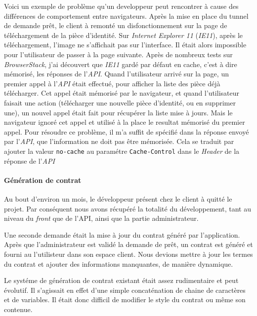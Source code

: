 \documentclass[12pt,a4paper]{article}
\begin{document}
  Voici un exemple de problème qu'un developpeur peut rencontrer à cause
  des différences de comportement entre navigateurs. Après la mise en
  place du tunnel de demande prêt, le client à remonté un
  disfonctionnement sur la page de téléchargement de la pièce d'identité.
  Sur \emph{Internet Explorer 11} (\emph{IE11}), après le téléchargement,
  l'image ne s'affichait pas sur l'interface. Il était alors impossible
  pour l'utilisateur de passer à la page suivante. Après de nombreux tests
  sur \emph{BrowserStack}, j'ai découvert que \emph{IE11} gardé par défaut
  en cache, c'est à dire mémorisé, les réponses de l'\emph{API}. Quand
  l'utilisateur arrivé sur la page, un premier appel à l'\emph{API} était
  effectué, pour afficher la liste des pièce déjà télécharger. Cet appel
  était mémorisé par le navigateur, et quand l'utilisateur faisait une
  action (télécharger une nouvelle pièce d'identité, ou en supprimer une),
  un nouvel appel était fait pour récupérer la liste mise à jours. Mais le
  navigateur ignoré cet appel et utilisé à la place le resultat mémorisé
  du premier appel. Pour résoudre ce problème, il m'a suffit de spécifié
  dans la réponse envoyé par l'\emph{API}, que l'information ne doit pas
  être mémorisée. Cela se traduit par ajouter la valeur \texttt{no-cache}
  au paramétre \texttt{Cache-Control} dans le \emph{Header} de la réponse
  de l'\emph{API}

  \bigskip

  \paragraph{Génération de contrat}\label{guxe9nuxe9ration-de-contrat}

  Au bout d'environ un mois, le développeur présent chez le client à
  quitté le projet. Par conséquent nous avons récupéré la totalité du
  développement, tant au niveau du \emph{front} que de l'API, ainsi que la
  partie administrateur.

  \bigskip

  Une seconde demande était la mise à jour du contrat généré par
  l'application. Après que l'administrateur est validé la demande de prêt,
  un contrat est généré et fourni au l'utilisteur dans son espace client.
  Nous devions mettre à jour les termes du contrat et ajouter des
  informations manquantes, de manière dynamique.

  \bigskip

  Le systéme de génération de contrat existant était assez rudimentaire et
  peut évolutif. Il s'agissait en effet d'une simple concaténation de
  chaine de caractères et de variables. Il était donc difficil de modifier
  le style du contrat ou même son contenue.
\end{document}
